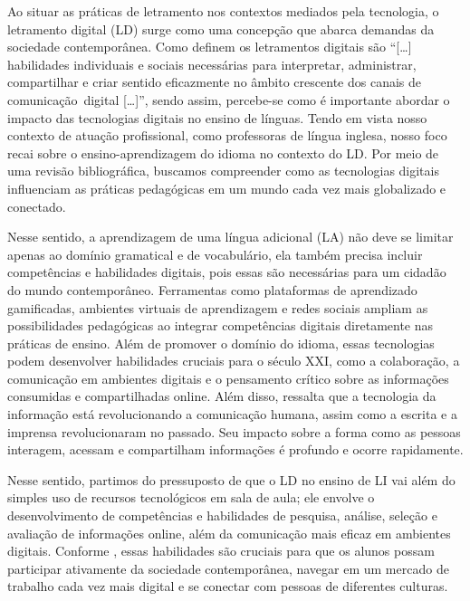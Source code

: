 Ao situar as práticas de letramento nos contextos mediados pela
tecnologia, o letramento digital (LD) surge como uma concepção que
abarca demandas da sociedade contemporânea. Como definem \textcite[p.~17]{dudeney2016letramentos}
 os letramentos digitais são ``{[}\ldots{]}
habilidades individuais e sociais necessárias para interpretar,
administrar, compartilhar e criar sentido eficazmente no âmbito
crescente dos canais de comunicação~digital {[}\ldots{]}'', sendo assim,
percebe-se como é importante abordar o impacto das tecnologias digitais
no ensino de línguas. Tendo em vista nosso contexto de atuação
profissional, como professoras de língua inglesa, nosso foco recai sobre
o ensino-aprendizagem do idioma no contexto do LD. Por meio de uma
revisão bibliográfica, buscamos compreender como as tecnologias digitais
influenciam as práticas pedagógicas em um mundo cada vez mais
globalizado e conectado.

Nesse sentido, a aprendizagem de uma língua adicional (LA) não deve se
limitar apenas ao domínio gramatical e de vocabulário, ela também
precisa incluir competências e habilidades digitais, pois essas são
necessárias para um cidadão do mundo contemporâneo. Ferramentas como
plataformas de aprendizado gamificadas, ambientes virtuais de
aprendizagem e redes sociais ampliam as possibilidades pedagógicas ao
integrar competências digitais diretamente nas práticas de ensino. Além
de promover o domínio do idioma, essas tecnologias podem desenvolver
habilidades cruciais para o século XXI, como a colaboração, a comunicação
em ambientes digitais e o pensamento crítico sobre as informações
consumidas e compartilhadas online. Além disso, \textcite{warschauer2000changing} ressalta que a tecnologia da informação está revolucionando a
comunicação humana, assim como a escrita e a imprensa revolucionaram no
passado. Seu impacto sobre a forma como as pessoas interagem, acessam e
compartilham informações é profundo e ocorre rapidamente.

Nesse sentido, partimos do pressuposto de que o LD no ensino de LI vai
além do simples uso de recursos tecnológicos em sala de aula; ele
envolve o desenvolvimento de competências e habilidades de pesquisa,
análise, seleção e avaliação de informações online, além da comunicação
mais eficaz em ambientes digitais. Conforme \textcite{dudeney2016letramentos}, essas habilidades são cruciais para que os alunos possam
participar ativamente da sociedade contemporânea, navegar em um mercado
de trabalho cada vez mais digital e se conectar com pessoas de
diferentes culturas.

